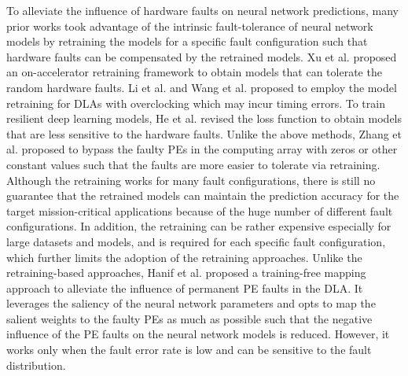 To alleviate the influence of hardware faults on neural network predictions, many prior works \cite{error2018date} \cite{energy2018kim} \cite{axtrain2018he} took advantage of the intrinsic fault-tolerance of neural network models by retraining the models for a specific fault configuration such that hardware faults can be compensated by the retrained models. Xu et al. \cite{xu2019resilient} proposed an on-accelerator retraining framework to obtain models that can tolerate the random hardware faults. Li et al. \cite{li2019squeezing} and Wang et al. \cite{wang2017resilience} proposed to employ the model retraining for DLAs with overclocking which may incur timing errors. To train resilient deep learning models, He et al. \cite{axtrain2018he} revised the loss function to obtain models that are less sensitive to the hardware faults. Unlike the above methods, Zhang et al. \cite{zhang2018analyzing} \cite{zhang2019fault} proposed to bypass the faulty PEs in the computing array with zeros or other constant values such that the faults are more easier to tolerate via retraining. Although the retraining works for many fault configurations, there is still no guarantee that the retrained models can maintain the prediction accuracy for the target mission-critical applications because of the huge number of different fault configurations. In addition, the retraining can be rather expensive especially for large datasets and models, and is required for each specific fault configuration, which further limits the adoption of the retraining approaches. Unlike the retraining-based approaches, Hanif et al. \cite{abdullah2020salvagednn} proposed a training-free mapping approach to alleviate the influence of permanent PE faults in the DLA. It leverages the saliency of the neural network parameters and opts to map the salient weights to the faulty PEs as much as possible such that the negative influence of the PE faults on the neural network models is reduced. However, it works only when the fault error rate is low and can be sensitive to the fault distribution.  

